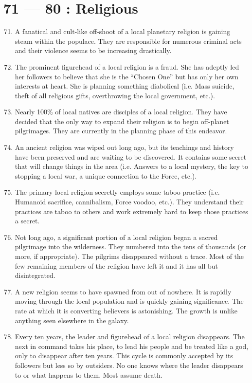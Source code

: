 \documentclass{article}
\begin{document}
\section*{71 --- 80 : Religious}
\begin{enumerate}
	\setcounter{enumi}{70}
	\item A fanatical and cult-like off-shoot of a local planetary religion is gaining steam within the populace. They are responsible for numerous criminal acts and their violence seems to be increasing drastically.
	\item The prominent figurehead of a local religion is a fraud. She has adeptly led her followers to believe that she is the “Chosen One” but has only her own interests at heart. She is planning something diabolical (i.e. Mass suicide, theft of all religious gifts, overthrowing the local government, etc.).
	\item Nearly 100\% of local natives are disciples of a local religion. They have decided that the only way to expand their religion is to begin off-planet pilgrimages. They are currently in the planning phase of this endeavor.
	\item An ancient religion was wiped out long ago, but its teachings and history have been preserved and are waiting to be discovered. It contains some secret that will change things in the area (i.e. Answers to a local mystery, the key to stopping a local war, a unique connection to the Force, etc.).
	\item The primary local religion secretly employs some taboo practice (i.e. Humanoid sacrifice, cannibalism, Force voodoo, etc.). They understand their practices are taboo to others and work extremely hard to keep those practices a secret.
	\item Not long ago, a significant portion of a local religion began a sacred pilgrimage into the wilderness. They numbered into the tens of thousands (or more, if appropriate). The pilgrims disappeared without a trace. Most of the few remaining members of the religion have left it and it has all but disintegrated.
	\item A new religion seems to have spawned from out of nowhere. It is rapidly moving through the local population and is quickly gaining significance. The rate at which it is converting believers is astonishing. The growth is unlike anything seen elsewhere in the galaxy.
	\item Every ten years, the leader and figurehead of a local religion disappears. The next in command takes his place, to lead his people and be treated like a god, only to disappear after ten years. This cycle is commonly accepted by its followers but less so by outsiders. No one knows where the leader disappears to or what happens to them. Most assume death.

\end{enumerate}
\end{document}
